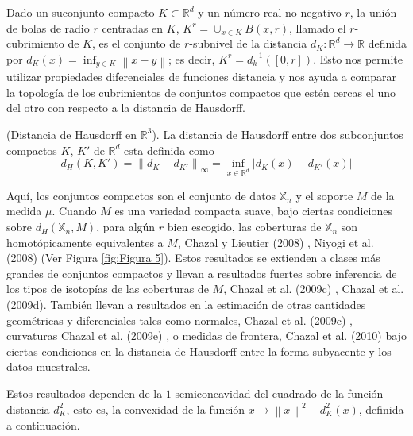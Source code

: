 Dado un suconjunto compacto $K\subset\mathbb{R}^{d}$ y un n\'umero real no negativo $r$, la uni\'on de
bolas de radio $r$ centradas en $K$, $K^{r} = \cup_{x\in K}B\left(x, r\right)$, llamado el
$r$-cubrimiento de $K$, es el conjunto de $r$-subnivel de la distancia
$d_{K}:\mathbb{R}^{d}\rightarrow\mathbb{R}$ definida por
$d_{K}\left(x\right) = \inf_{y\in K}\left\|x-y\right\|$; es decir,
$K^{r} = d^{-1}_{k}\left(\left[0, r\right]\right)$. Esto nos permite utilizar propiedades diferenciales
de funciones distancia y nos ayuda a comparar la topolog\'ia de los cubrimientos de conjuntos compactos
 que est\'en cercas el uno del otro con respecto a la distancia de Hausdorff.
 
\begin{definicion}
    (Distancia de Hausdorff en $\mathbb{R}^{3}$). La distancia de Hausdorff entre dos subconjuntos compactos
    $K$, $K'$ de $\mathbb{R}^{d}$ esta definida como
    \begin{equation*}
        d_{H}\left(K, K'\right) = \left\|d_{K}-d_{K'}\right\|_{\infty} =
        \inf_{x\in\mathbb{R}^{d}}\left|d_{K}\left(x\right)-d_{K'}\left(x\right)\right|
    \end{equation*}
\end{definicion}
 
Aqu\'i, los conjuntos compactos son el conjunto de datos $\mathbb{X}_{n}$ y el soporte $M$ de la
medida $\mu$. Cuando $M$ es una variedad compacta suave, bajo ciertas condiciones sobre
$d_{H}\left(\mathbb{X}_{n}, M\right)$, para alg\'un $r$ bien escogido, las coberturas de
$\mathbb{X}_{n}$ son homot\'opicamente equivalentes a $M$, Chazal y Lieutier (2008) \cite{Chazal2008},
Niyogi et al. (2008) \cite{Niyogi2008} (Ver Figura \ref{fig:Figura 5}). Estos resultados se extienden
a clases m\'as grandes de conjuntos compactos y llevan a resultados fuertes sobre inferencia de los
tipos de isotop\'ias de las coberturas de $M$, Chazal et al. (2009c) \cite{Chazal2009c},
Chazal et al. (2009d)\cite{Chazal2009d}. Tambi\'en llevan a resultados en la estimaci\'on de otras
cantidades geom\'etricas y diferenciales tales como normales, Chazal et al. (2009c) \cite{Chazal2009c},
curvaturas Chazal et al. (2009e) \cite{Chazal2009e}, o medidas de frontera,
Chazal et al. (2010) \cite{Chazal2010} bajo ciertas condiciones en la distancia de Hausdorff entre la
forma subyacente y los datos muestrales.
 
Estos resultados dependen de la $1$-semiconcavidad del cuadrado de la funci\'on distancia $d_{K}^{2}$,
esto es, la convexidad de la funci\'on $x\rightarrow\left\|x\right\|^{2}-d_{K}^{2}\left(x\right)$,
definida a continuaci\'on.
 
